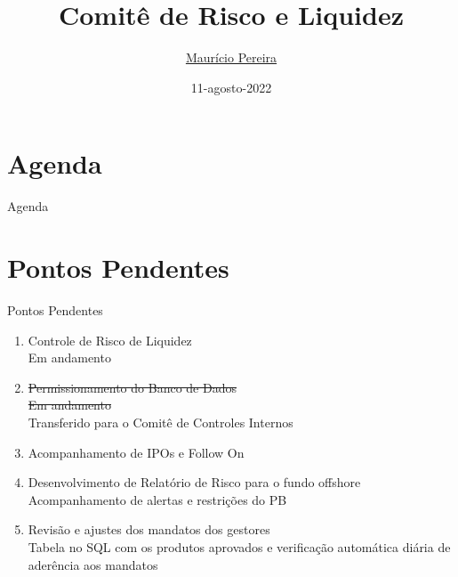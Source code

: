 \documentclass[t,aspectratio=169]{beamer}
\title[Comitê de Risco]{
	Comitê de Risco e Liquidez}
\date{11-agosto-2022}
\author[\href{mailto:risco@asset1.com.br}{risco@asset1.com.br}]{
	\href{mailto:mauricio.pereira@asset1.com.br}{Maurício Pereira}\\
	\vspace{0.10cm}
}
\begin{document}

{
	\begin{frame}
		\maketitle
	\end{frame}
}

\section*{Agenda}
\begin{frame}{Agenda}
	\tableofcontents
\end{frame}

\section[Pendências]{Pontos Pendentes}
\begin{frame}{Pontos Pendentes}
	\begin{enumerate}
		\item Controle de Risco de Liquidez\\
		Em andamento
		\item \sout{Permissionamento do Banco de Dados}\\
		\sout{Em andamento} \\
		{\smaller Transferido para o Comitê de Controles Internos}
		
		\item {\color{blue1}Acompanhamento de IPOs e Follow On}
		
		\item {\color{blue1}Desenvolvimento de Relatório de Risco para o fundo offshore}\\
		Acompanhamento de alertas e restrições do PB
		
		\item {\color{blue1}Revisão e ajustes dos mandatos dos gestores}\\
		Tabela no SQL com os produtos aprovados e verificação automática diária de aderência aos mandatos
		
	\end{enumerate}
\end{frame}
\end{document}
